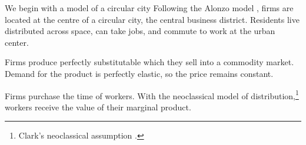 
We begin with a model of a circular city %
Following the \gls{Alonzo model} \cite{alonzoTheoryUrbanLand1960, alonsoLocationLandUse1964}, firms are located at the centre of a circular city, the central business district. Residents live distributed across space, can take jobs, and commute to work at the urban center. 

Firms produce perfectly \gls{substitutable} %
which they sell into a commodity market. Demand for the \gls{product} is \gls{perfectly elastic}, so the price remains constant. 

Firms purchase the time of workers. %
With the neoclassical model of distribution,\footnote{Clark's neoclassical assumption \cite{clarkDistributionWealthTheory1899}.} 
workers receive the value of their marginal product. 

 


